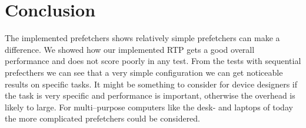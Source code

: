 \section{Conclusion} %


The implemented prefetchers shows relatively simple prefetchers can
make a difference. We showed how our implemented RTP gets a good
overall performance and does not score poorly in any test. From the
tests with sequential prefecthers we can see that a very simple
configuration we can get noticeable results on specific tasks. It might
be something to consider for device designers if the task is very
specific and performance is important, otherwise the overhead is
likely to large. For multi--purpose computers
like the desk- and laptops of today the more complicated prefetchers
could be considered. 
